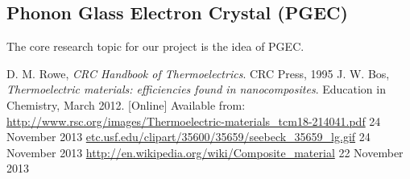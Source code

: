 \documentclass[a4paper,10pt,journal]{IEEEtran}
\begin{document}
\subsection{Phonon Glass Electron Crystal (PGEC)}
The core research topic for our project is the idea of PGEC.


\begin{thebibliography}{2}
D. M. Rowe, \emph{CRC Handbook of Thermoelectrics}. CRC Press, 1995
J. W. Bos, \emph{Thermoelectric materials: efficiencies found in
nanocomposites}. Education in Chemistry, March 2012. [Online] Available
from:
\url{http://www.rsc.org/images/Thermoelectric-materials_tcm18-214041.pdf} 24 November 2013
\url{etc.usf.edu/clipart/35600/35659/seebeck_35659_lg.gif} 24 November
2013
\url{http://en.wikipedia.org/wiki/Composite_material} 22 November 2013
\end{thebibliography}
\end{document}
